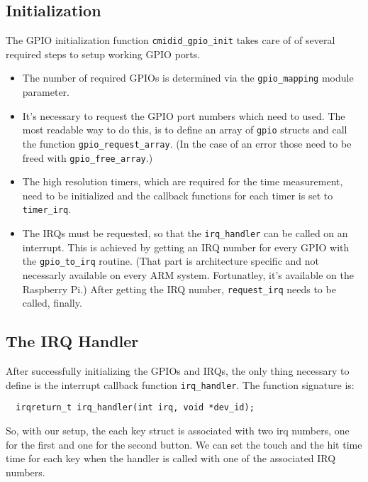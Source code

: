 \documentclass[paper=a4,fontsize=11pt,twocolumn,pagesize,bibtotoc]{scrartcl}
\begin{document}
\subsection{Initialization}
\label{gpios:init}

The GPIO initialization function \texttt{cmidid\_gpio\_init} takes care of of 
several required steps to setup working GPIO ports.

\begin{itemize}
  \item The number of required GPIOs is determined via the \texttt{gpio\_mapping}
    module parameter.
  \item It's necessary to request the GPIO port numbers which need to used.
    The most readable way to do this, is to define an array of \texttt{gpio}
    structs and call the function \texttt{gpio\_request\_array}. (In the case
    of an error those need to be freed with \texttt{gpio\_free\_array}.)
  \item The high resolution timers, which are required for the time 
    measurement, need to be initialized and the callback functions for each
    timer is set to \texttt{timer\_irq}.
  \item The IRQs must be requested, so that the \texttt{irq\_handler} can be 
    called on an interrupt. This is achieved by getting an IRQ number for 
    every GPIO with the \texttt{gpio\_to\_irq} routine. (That part is 
    architecture specific and not necessarly available on every ARM system.
    Fortunatley, it's available on the Raspberry Pi.) After getting the IRQ
    number, \texttt{request\_irq} needs to be called, finally.
\end{itemize}

\subsection{The IRQ Handler}
\label{gpios:irqhandler}

After successfully initializing the GPIOs and IRQs, the only thing necessary 
to define is the interrupt callback function \texttt{irq\_handler}. The function
signature is:
\begin{lstlisting}
  irqreturn_t irq_handler(int irq, void *dev_id);
\end{lstlisting}
So, with our setup, the each key struct is associated with two irq numbers, 
one for the first and one for the second button. We can set the touch and the 
hit time time for each key when the handler is called with one of the associated IRQ
numbers. 
\end{document}
